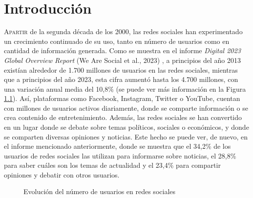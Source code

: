 \chapter{Introducción}
\label{chap:introduccion}

\lettrine{A}{partir} de la segunda década de los 2000, las redes sociales han experimentado
un crecimiento continuado de su uso, tanto en número de usuarios como en
cantidad de información generada. Como se muestra en el informe \textit{Digital 2023 Global Overview Report} (We Are Social et al., 2023)
\cite{wearesocial}, a principios del año 2013 existían alrededor de 1.700 millones de usuarios en las redes sociales,
mientras que a principios del año 2023, esta cifra aumentó hasta los 4.700 millones, con una variación anual media del 10,8\% (se puede ver
más información en la Figura \ref{fig:usuarios_redes_sociales}).
Así, plataformas como Facebook, Instagram, Twitter o YouTube, cuentan con millones de usuarios activos diariamente,
donde se comparte información o se crea contenido de entretenimiento. Además, las redes sociales se han convertido en
un lugar donde se debate sobre temas políticos, sociales o económicos, y donde se comparten diversas opiniones y noticias.
Este hecho se puede ver, de nuevo, en el informe mencionado anteriormente, donde se muestra que el 34,2\% de los usuarios
de redes sociales las utilizan para informarse sobre noticias, el 28,8\% para saber cuáles son los temas de actualidad
y el 23,4\% para compartir opiniones y debatir con otros usuarios.

\bigskip
\begin{figure}[H]
	\centering
	\caption{Evolución del número de usuarios en redes sociales}
	\label{fig:usuarios_redes_sociales}
\end{figure}

